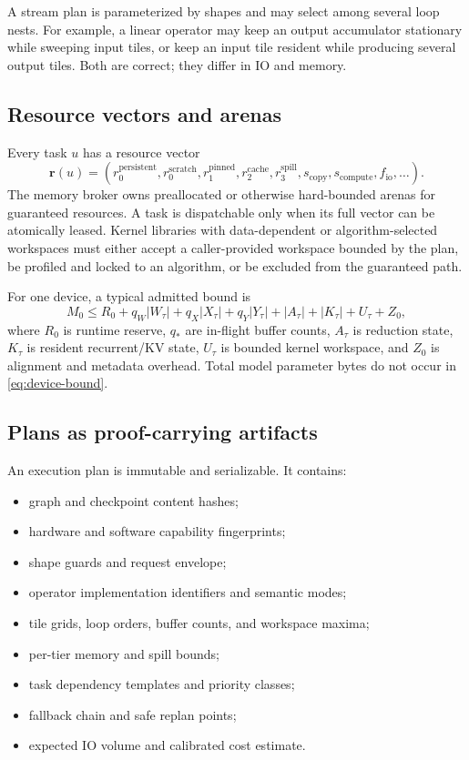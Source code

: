 A stream plan is parameterized by shapes and may select among several loop nests. For example, a linear operator may keep an output accumulator stationary while sweeping input tiles, or keep an input tile resident while producing several output tiles. Both are correct; they differ in IO and memory.

\subsection{Resource vectors and arenas}

Every task $u$ has a resource vector
\[
  \mathbf r(u)=
  (r_{0}^{\mathrm{persistent}},r_{0}^{\mathrm{scratch}},
   r_{1}^{\mathrm{pinned}},r_{2}^{\mathrm{cache}},r_{3}^{\mathrm{spill}},
   s_{\mathrm{copy}},s_{\mathrm{compute}},f_{\mathrm{io}},\ldots).
\]
The memory broker owns preallocated or otherwise hard-bounded arenas for guaranteed resources. A task is dispatchable only when its full vector can be atomically leased. Kernel libraries with data-dependent or algorithm-selected workspaces must either accept a caller-provided workspace bounded by the plan, be profiled and locked to an algorithm, or be excluded from the guaranteed path.

For one device, a typical admitted bound is
\begin{equation}
\label{eq:device-bound}
M_0 \le R_0
 + q_W\lvert W_\tau\rvert
 + q_X\lvert X_\tau\rvert
 + q_Y\lvert Y_\tau\rvert
 + \lvert A_\tau\rvert
 + \lvert K_\tau\rvert
 + U_\tau + Z_0,
\end{equation}
where $R_0$ is runtime reserve, $q_*$ are in-flight buffer counts, $A_\tau$ is reduction state, $K_\tau$ is resident recurrent/KV state, $U_\tau$ is bounded kernel workspace, and $Z_0$ is alignment and metadata overhead. Total model parameter bytes do not occur in \eqref{eq:device-bound}.

\subsection{Plans as proof-carrying artifacts}

An execution plan is immutable and serializable. It contains:

\begin{itemize}
  \item graph and checkpoint content hashes;
  \item hardware and software capability fingerprints;
  \item shape guards and request envelope;
  \item operator implementation identifiers and semantic modes;
  \item tile grids, loop orders, buffer counts, and workspace maxima;
  \item per-tier memory and spill bounds;
  \item task dependency templates and priority classes;
  \item fallback chain and safe replan points;
  \item expected IO volume and calibrated cost estimate.
\end{itemize}

